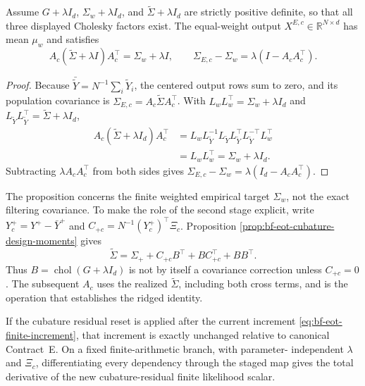 \begin{proposition}
\label{prop:bf-eot-cubature-restoration}
Assume \(G+\lambda I_d\), \(\Sigma_w+\lambda I_d\), and
\(\widetilde\Sigma+\lambda I_d\) are strictly positive definite, so that all
three displayed Cholesky factors exist.  The equal-weight output
\(X^{E,c}\in\mathbb R^{N\times d}\) has mean \(\mu_w\) and satisfies
\begin{equation}
 A_c(\widetilde\Sigma+\lambda I)A_c^\top=\Sigma_w+\lambda I,
 \qquad
 \Sigma_{E,c}-\Sigma_w=\lambda(I-A_cA_c^\top).
\end{equation}
\end{proposition}

\begin{proof}
Because \(\bar{\widetilde Y}=N^{-1}\sum_i\widetilde Y_i\), the centered output
rows sum to zero, and its population covariance is
\(\Sigma_{E,c}=A_c\widetilde\Sigma A_c^\top\).  With
\(L_wL_w^\top=\Sigma_w+\lambda I_d\) and
\(L_{\widetilde Y}L_{\widetilde Y}^\top=\widetilde\Sigma+\lambda I_d\),
\begin{align*}
A_c(\widetilde\Sigma+\lambda I_d)A_c^\top
&=L_wL_{\widetilde Y}^{-1}L_{\widetilde Y}L_{\widetilde Y}^\top
  L_{\widetilde Y}^{-\top}L_w^\top\\
&=L_wL_w^\top=\Sigma_w+\lambda I_d.
\end{align*}
Subtracting \(\lambda A_cA_c^\top\) from both sides gives
\(\Sigma_{E,c}-\Sigma_w=\lambda(I_d-A_cA_c^\top)\).
\end{proof}

The proposition concerns the finite weighted empirical target \(\Sigma_w\), not
the exact filtering covariance.  To make the role of the second stage explicit,
write \(Y_c^+=Y^+-\bar Y^+\) and
\(C_{+c}=N^{-1}(Y_c^+)^\top\Xi_c\).  Proposition
\ref{prop:bf-eot-cubature-design-moments} gives
\begin{equation}
\label{eq:bf-eot-cubature-realized-covariance}
\widetilde\Sigma
 =\Sigma_+ + C_{+c}B^\top + BC_{+c}^\top + BB^\top.
\end{equation}
Thus \(B=\operatorname{chol}(G+\lambda I_d)\) is not by itself a covariance
correction unless \(C_{+c}=0\).  The subsequent \(A_c\) uses the realized
\(\widetilde\Sigma\), including both cross terms, and is the operation that
establishes the ridged identity.

\begin{proposition}
\label{prop:bf-eot-cubature-likelihood-score}
If the cubature residual reset is applied after the current increment
\eqref{eq:bf-eot-finite-increment}, that increment is exactly unchanged relative
to canonical Contract~E.  On a fixed finite-arithmetic branch, with parameter-
independent \(\lambda\) and \(\Xi_c\), differentiating every dependency through
the staged map gives the total derivative of the new cubature-residual finite
likelihood scalar.
\end{proposition}

